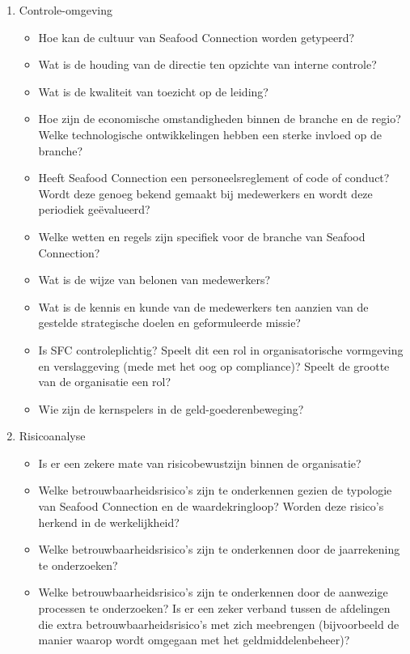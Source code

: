 \begin{enumerate}
    \item Controle-omgeving
        \begin{itemize}
            \item Hoe kan de cultuur van Seafood Connection worden getypeerd?
            \item Wat is de houding van de directie ten opzichte van interne controle?
            \item Wat is de kwaliteit van toezicht op de leiding?
            \item Hoe zijn de economische omstandigheden binnen de branche en de regio? Welke technologische ontwikkelingen hebben een sterke invloed op de branche?
            \item Heeft Seafood Connection een personeelsreglement of code of conduct? Wordt deze genoeg bekend gemaakt bij medewerkers en wordt deze periodiek geëvalueerd?
            \item Welke wetten en regels zijn specifiek voor de branche van Seafood Connection?
            \item Wat is de wijze van belonen van medewerkers?
            \item Wat is de kennis en kunde van de medewerkers ten aanzien van de gestelde strategische doelen en geformuleerde missie?
            \item Is SFC controleplichtig? Speelt dit een rol in organisatorische vormgeving en verslaggeving (mede met het oog op compliance)? Speelt de grootte van de organisatie een rol?
            \item Wie zijn de kernspelers in de geld-goederenbeweging?
        \end{itemize}
    \item Risicoanalyse
        \begin{itemize}
            \item Is er een zekere mate van risicobewustzijn binnen de organisatie?
            \item Welke betrouwbaarheidsrisico's zijn te onderkennen gezien de typologie van Seafood Connection en de waardekringloop? Worden deze risico's herkend in de werkelijkheid?
            \item Welke betrouwbaarheidsrisico's zijn te onderkennen door de jaarrekening te onderzoeken?
            \item Welke betrouwbaarheidsrisico's zijn te onderkennen door de aanwezige processen te onderzoeken? Is er een zeker verband tussen de afdelingen die extra betrouwbaarheidsrisico's met zich meebrengen (bijvoorbeeld de manier waarop wordt omgegaan met het geldmiddelenbeheer)?

\end{itemize}
\end{enumerate}
